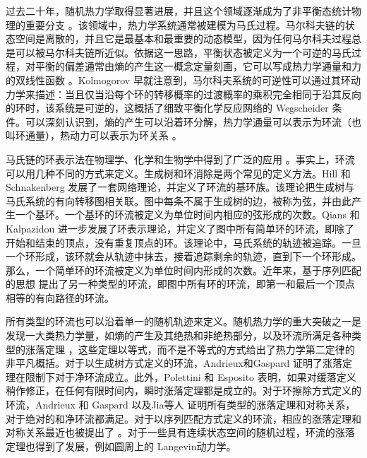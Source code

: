 

过去二十年，随机热力学取得显著进展，并且这个领域逐渐成为了非平衡态统计物理的重要分支 \cite{annurev-conmatphys,Seifert_2012,VANDENBROECK20156} 。该领域中，热力学系统通常被建模为马氏过程。马尔科夫链的状态空间是离散的，并且它是最基本和最重要的动态模型，因为任何马尔科夫过程总是可以被马尔科夫链所近似。依据这一思路，平衡状态被定义为一个可逆的马氏过程，对平衡的偏差通常由熵的产生这一概念定量刻画，它可以写成热力学通量和力的双线性函数 \cite{PhysRev.91.1505}。Kolmogorov \cite{Math.Ann.112} 早就注意到，马尔科夫系统的可逆性可以通过其环动力学来描述：当且仅当沿每个环的转移概率的过渡概率的乘积完全相同于沿其反向的环时，该系统是可逆的，这概括了细致平衡化学反应网络的 Wegscheider 条件。可以深刻认识到，熵的产生可以沿着环分解，热力学通量可以表示为环流（也叫环通量），热动力可以表示为环关系 \cite{Schnakenberg1976NetworkTO}。

马氏链的环表示法在物理学、化学和生物学中得到了广泛的应用 \cite{ZHANG20121,GE201287}。事实上，环流可以用几种不同的方式来定义。生成树和环消除是两个常见的定义方法。Hill \cite{Hill1966StudiesIIa,Hill1966StudiesIIb,hill2013free} 和 Schnakenberg \cite{Schnakenberg1976NetworkTO} 发展了一套网络理论，并定义了环流的基环族。该理论把生成树与马氏系统的有向转移图相关联。图中每条不属于生成树的边，被称为弦，并由此产生一个基环。一个基环的环流被定义为单位时间内相应的弦形成的次数。Qians \cite{minping1982circulation,jian1984circulations,jiang2004mathematical}和 Kalpazidou \cite{kalpazidou2007cycle} 进一步发展了环表示理论，并定义了图中所有简单环的环流，即除了开始和结束的顶点，没有重复顶点的环。该理论中，马氏系统的轨迹被追踪。一旦一个环形成，该环就会从轨迹中抹去，接着追踪剩余的轨迹，直到下一个环形成。那么，一个简单环的环流被定义为单位时间内形成的次数。近年来，基于序列匹配的思想 \cite{roldan2019exact,biddle2020reversal,pietzonka2021cycle} 提出了另一种类型的环流，即图中所有环的环流，即第一和最后一个顶点相等的有向路径的环流。

所有类型的环流也可以沿着单一的随机轨迹来定义。随机热力学的重大突破之一是发现一大类热力学量，如熵的产生及其绝热和非绝热部分，以及环流所满足各种类型的涨落定理 \cite{annurev-conmatphys,Seifert_2012,VANDENBROECK20156}，这些定理以等式，而不是不等式的方式给出了热力学第二定律的非平凡概括。对于以生成树方式定义的环流，Andrieux和Gaspard \cite{andrieux2007fluctuation}证明了涨落定理在限制下对于净环流成立。此外，Polettini 和 Esposito \cite{polettini2014transient}表明，如果对缓落定义稍作修正，在任何有限时间内，瞬时涨落定理都是成立的。对于环擦除方式定义的环流，Andrieux 和 Gaspard \cite{andrieux2007network}以及Jia等人 \cite{jia2016cycle} 证明所有类型的涨落定理和对称关系，对于绝对的和净环流都满足。对于以序列匹配方式定义的环流，相应的涨落定理和对称关系最近也被提出了 \cite{pietzonka2021cycle}。对于一些具有连续状态空间的随机过程，环流的涨落定理也得到了发展，例如圆周上的 Langevin动力学\cite{ge2017cycle}。

